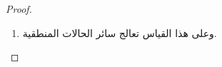 \documentclass[../../../include/open-logic-section]{subfiles}
\begin{document}
\begin{proof}
\begin{enumerate}
    نعيد وسم نسختي البرهان تجنبًا للأسر بحيث تكون وسومهما متباينة. وفي
    الحالة الثانية نتخذ~$\delta=\delta_{\OLMathNumeral{2}}$. وإلا استبدل بكل مسلّمة
    ${\OLId{latin-ordinary}{x}}:!A \Sequent !A$ في~$\delta_{\OLMathNumeral{2}}$ البرهان~$\delta_{\OLMathNumeral{1}}$ لنحصل على~$\delta$
    بوصفه~!!{proof}~$\Subst{\delta_{\OLMathNumeral{2}}}{\delta_{\OLMathNumeral{1}}}{{\OLId{latin-ordinary}{x}}:!A}$ للمتتالية
    ${\OLId{greek-variable}{Gamma}}_{\OLMathNumeral{1}}',{\OLId{greek-variable}{Gamma}}_{\OLMathNumeral{2}}' \Sequent !C$.
    \item وعلى هذا القياس تعالج سائر الحالات المنطقية.
  \end{enumerate}
\end{proof}
\end{document}
